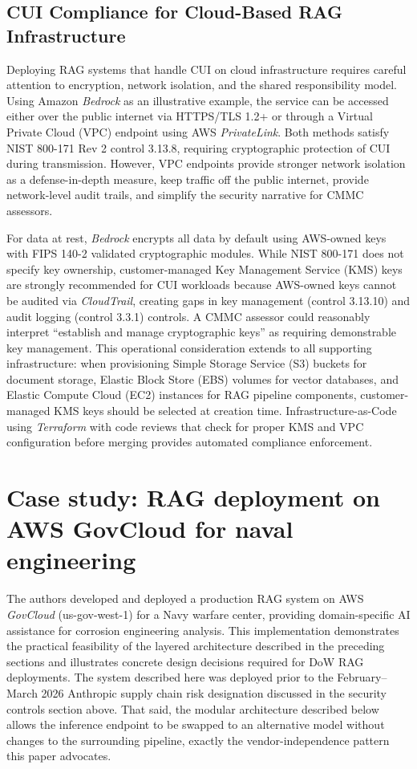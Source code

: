 \documentclass[12pt,letterpaper]{article}
\begin{document}
\subsection{CUI Compliance for Cloud-Based RAG Infrastructure}

Deploying RAG systems that handle CUI on cloud infrastructure requires careful attention to encryption, network isolation, and the shared responsibility model. Using Amazon \textit{Bedrock} as an illustrative example, the service can be accessed either over the public internet via HTTPS/TLS 1.2+ or through a Virtual Private Cloud (VPC) endpoint using AWS \textit{PrivateLink}. Both methods satisfy NIST 800-171 Rev 2 control 3.13.8, requiring cryptographic protection of CUI during transmission. However, VPC endpoints provide stronger network isolation as a defense-in-depth measure, keep traffic off the public internet, provide network-level audit trails, and simplify the security narrative for CMMC assessors.

For data at rest, \textit{Bedrock} encrypts all data by default using AWS-owned keys with FIPS 140-2 validated cryptographic modules. While NIST 800-171 does not specify key ownership, customer-managed Key Management Service (KMS) keys are strongly recommended for CUI workloads because AWS-owned keys cannot be audited via \textit{CloudTrail}, creating gaps in key management (control 3.13.10) and audit logging (control 3.3.1) controls. A CMMC assessor could reasonably interpret ``establish and manage cryptographic keys'' as requiring demonstrable key management. This operational consideration extends to all supporting infrastructure: when provisioning Simple Storage Service (S3) buckets for document storage, Elastic Block Store (EBS) volumes for vector databases, and Elastic Compute Cloud (EC2) instances for RAG pipeline components, customer-managed KMS keys should be selected at creation time. Infrastructure-as-Code using \textit{Terraform} with code reviews that check for proper KMS and VPC configuration before merging provides automated compliance enforcement.

\section{Case study: RAG deployment on AWS GovCloud for naval engineering}

The authors developed and deployed a production RAG system on AWS \textit{GovCloud} (us-gov-west-1) for a Navy warfare center, providing domain-specific AI assistance for corrosion engineering analysis. This implementation demonstrates the practical feasibility of the layered architecture described in the preceding sections and illustrates concrete design decisions required for DoW RAG deployments. The system described here was deployed prior to the February--March 2026 Anthropic supply chain risk designation discussed in the security controls section above. That said, the modular architecture described below allows the inference endpoint to be swapped to an alternative model without changes to the surrounding pipeline, exactly the vendor-independence pattern this paper advocates.
\end{document}

